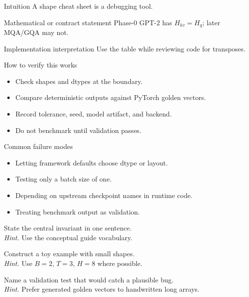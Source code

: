 \begin{intuitionbox}{Intuition}
A shape cheat sheet is a debugging tool.
\end{intuitionbox}

\begin{definitionbox}{Mathematical or contract statement}
Phase-0 GPT-2 has \(H_{kv}=H_q\); later MQA/GQA may not.
\end{definitionbox}

\begin{implementationbox}{Implementation interpretation}
Use the table while reviewing code for transposes.
\end{implementationbox}

\begin{verificationbox}{How to verify this works}
\begin{itemize}
\item Check shapes and dtypes at the boundary.
\item Compare deterministic outputs against PyTorch golden vectors.
\item Record tolerance, seed, model artifact, and backend.
\item Do not benchmark until validation passes.
\end{itemize}
\end{verificationbox}

\begin{warningbox}{Common failure modes}
\begin{itemize}
\item Letting framework defaults choose dtype or layout.
\item Testing only a batch size of one.
\item Depending on upstream checkpoint names in runtime code.
\item Treating benchmark output as validation.
\end{itemize}
\end{warningbox}

\begin{chapterexercises}
\item State the central invariant in one sentence.\\
\textit{Hint.} Use the conceptual guide vocabulary.
\item Construct a toy example with small shapes.\\
\textit{Hint.} Use $B=2$, $T=3$, $H=8$ where possible.
\item Name a validation test that would catch a plausible bug.\\
\textit{Hint.} Prefer generated golden vectors to handwritten long arrays.
\end{chapterexercises}

